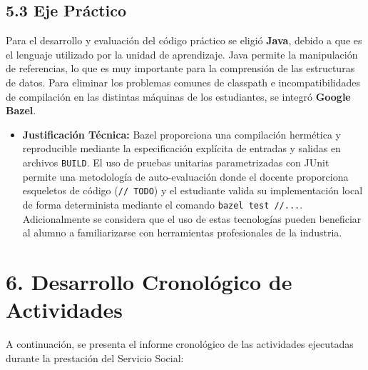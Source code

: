 \documentclass[12 pt]{article}
\begin{document}
\subsection*{5.3 Eje Práctico}
Para el desarrollo y evaluación del código práctico se eligió \textbf{Java}, debido a que es el lenguaje utilizado por la unidad de aprendizaje. Java permite la manipulación de referencias, lo que es muy importante para la comprensión de las estructuras de datos. Para eliminar los problemas comunes de classpath e incompatibilidades de compilación en las distintas máquinas de los estudiantes, se integró \textbf{Google Bazel}.
\begin{itemize}
    \item \textbf{Justificación Técnica:} Bazel proporciona una compilación hermética y reproducible mediante la especificación explícita de entradas y salidas en archivos \texttt{BUILD}. El uso de pruebas unitarias parametrizadas con JUnit permite una metodología de auto-evaluación donde el docente proporciona esqueletos de código (\texttt{// TODO}) y el estudiante valida su implementación local de forma determinista mediante el comando \texttt{bazel test //...}. Adicionalmente se considera que el uso de estas tecnologías pueden beneficiar al alumno a familiarizarse con herramientas profesionales de la industria.
\end{itemize}

\section*{6. Desarrollo Cronológico de Actividades}

A continuación, se presenta el informe cronológico de las actividades ejecutadas durante la prestación del Servicio Social:
\end{document}
